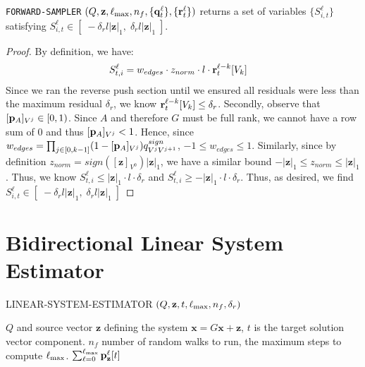\begin{lemma}
\texttt{FORWARD-SAMPLER} $(Q, \mathbf{z}, \ell_{\max}, n_f, \{\mathbf{q}^{\ell}_t\}, \{\mathbf{r}^{\ell}_t\})$ returns a set of variables $\{S_{i, t}^{\ell}\}$ satisfying $S_{i, t}^{\ell} \in [\;-\delta_r l |\mathbf{z}|_1 ,\; \delta_r l |\mathbf{z}|_1 \;]$.
\end{lemma}
\begin{proof}
By definition, we have:
\begin{align*}
S_{t, i}^{\ell} &= w_{edges}\cdot z_{norm} \cdot l \cdot \mathbf{r}^{\ell-k}_t[V_k]
\end{align*}
Since we ran the reverse push section until we ensured all residuals were less than the maximum residual $\delta_r$, we know
$\mathbf{r}^{\ell-k}_t[V_k] \leq \delta_r$. Secondly, observe that $[\mathbf{p}_A]_{V^j} \in [0, 1)$. Since $A$ and therefore $G$ must be full rank, we cannot have a row sum of $0$ and thus $[\mathbf{p}_A]_{V^j} < 1$. Hence, since $w_{edges} = \prod_{j \in [0, k-1]} (1- [\mathbf{p}_A]_{V^j})q^{sign}_{V^j V^{j+1}}$, $-1 \leq w_{edges} \leq 1$. Similarly, since by definition $z_{norm} = sign([\mathbf{z}]_{V^0})|\mathbf{z}|_1$, we have a similar bound $-|\mathbf{z}|_1 \leq z_{norm} \leq |\mathbf{z}|_1$.
Thus, we know $S_{t, i}^{\ell} \leq |\mathbf{z}|_1 \cdot l \cdot \delta_r$ and 
$S_{t, i}^{\ell} \geq - |\mathbf{z}|_1 \cdot l \cdot \delta_r$. Thus, as desired, we find $S_{i, t}^{\ell} \in [\;-\delta_r l |\mathbf{z}|_1 ,\; \delta_r l |\mathbf{z}|_1 \;]$

\end{proof}

\section{Bidirectional Linear System Estimator}
\begin{algorithm}[ht]
\caption{LINEAR-SYSTEM-ESTIMATOR $(Q, \mathbf{z}, t, \ell_{\max}, n_f, \delta_r)$}
\label{alg:linearsysest}
\begin{algorithmic}[1]
\REQUIRE $Q$ and source vector $\mathbf{z}$ defining the system $\mathbf{x} = G \mathbf{x} + \mathbf{z}$, $t$ is the target solution vector component. $n_f$ number of random walks to run, the maximum steps to compute $\ell_{\max}$.
\ENDFOR
\RETURN $\sum_{\ell=0}^{\ell_{\max}} {\mathbf{p}}_\mathbf{z}^{\ell}[t]$ 
\end{algorithmic}
\end{algorithm} 

